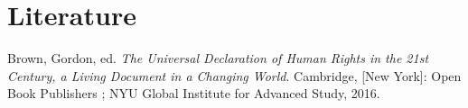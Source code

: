\documentclass[
  titlepage,
  openright,
  DIV=calc,
  toc=listof,
  listof=nochaptergap]{scrbook}
\newlength{\cslhangindent}
\newenvironment{CSLReferences}[2] %
 {\begin{list}{}{%
  \setlength{\itemindent}{0pt}
  \setlength{\leftmargin}{0pt}
  \setlength{\parsep}{0pt}
  \ifodd #1
   \setlength{\leftmargin}{\cslhangindent}
   \setlength{\itemindent}{-1\cslhangindent}
  \fi
  \setlength{\itemsep}{#2\baselineskip}}}
 {\end{list}}
\begin{document}
\label{refs_sources}
\begin{CSLReferences}{1}{0}
\end{CSLReferences}

\clearpage

\section{Literature}\label{literature}

\label{refs_main}
\begin{CSLReferences}{1}{0}
Brown, Gordon, ed. \emph{The {Universal} {Declaration} of {Human}
{Rights} in the 21st Century, a Living Document in a Changing World}.
Cambridge, {[}New York{]}: Open Book Publishers ; NYU Global Institute
for Advanced Study, 2016.

\end{CSLReferences}

\backmatter
\end{document}
